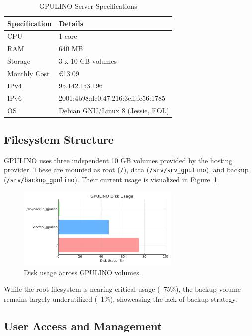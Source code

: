 \begin{table}[H]
  \centering
  \caption{GPULINO Server Specifications}
  \label{tab:gpulino_specs}
  \begin{tabular}{ll}
    \rowcolor{udcpink!25}
    \textbf{Specification} & \textbf{Details} \\
    \hline
    CPU & 1 core \\
    RAM & 640 MB \\
    Storage & 3 x 10 GB volumes \\
    Monthly Cost & €13.09 \\
    IPv4 & 95.142.163.196 \\
    IPv6 & 2001:4b98:dc0:47:216:3eff:fe56:1785 \\
    OS & Debian GNU/Linux 8 (Jessie, EOL) \\
  \end{tabular}
\end{table}

\subsection{Filesystem Structure}

GPULINO uses three independent 10 GB volumes provided by the hosting provider. These are mounted as root (\verb|/|), data (\verb|/srv/srv_gpulino|), and backup (\verb|/srv/backup_gpulino|). Their current usage is visualized in Figure~\ref{fig:gpulino_disk_usage}.

\begin{figure}[H]
  \centering
  \includegraphics[width=0.7\textwidth]{figuras/gpulino_disk_usage.pdf}
  \caption{Disk usage across GPULINO volumes.}
  \label{fig:gpulino_disk_usage}
\end{figure}

While the root filesystem is nearing critical usage (~75\%), the backup volume remains largely underutilized (~1\%), showcasing the lack of backup strategy.

\subsection{User Access and Management}

